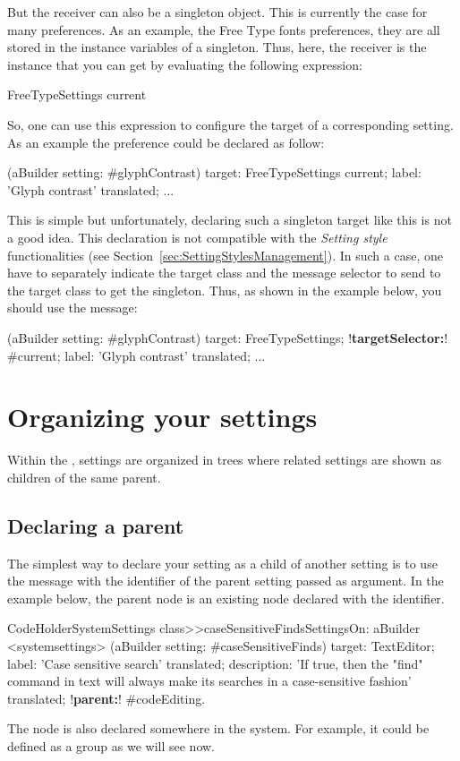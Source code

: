 \documentclass[a4paper,10pt,twoside]{book}
\begin{document}
But the receiver can also be a singleton object. This is currently the case for many preferences. As an example, the Free Type fonts preferences, they are all stored in the instance variables of a  singleton. Thus, here, the receiver is the  instance that you can get by evaluating the following expression:
\begin{code}{}
FreeTypeSettings current
\end{code}
So, one can use this expression  to configure the target of a corresponding setting. As an example the  preference could be declared as follow:
\begin{code}{}
(aBuilder setting: #glyphContrast) 
	target: FreeTypeSettings current;
	label: 'Glyph contrast' translated;
    ...
\end{code}
This is simple but unfortunately, declaring such a singleton target like this is not a good idea. This declaration is not compatible with the \textit{Setting style} functionalities (see Section~\ref{sec:SettingStylesManagement}). In such a case, one have to separately indicate the target class and the message selector to send to the target class to get the singleton. Thus, as shown in the example below, you should use the  message:

\begin{code}{}
(aBuilder setting: #glyphContrast) 
	target: FreeTypeSettings;
	!\textbf{targetSelector:}! #current;
	label: 'Glyph contrast' translated;
    ...
\end{code}

\section{Organizing your settings}

Within the \setbrowser, settings are organized in trees where related settings are shown as children of the same parent. 

\subsection{Declaring a parent}
The simplest way to declare your setting as a child of another setting is to use the  message with the identifier of the parent setting passed as argument. In the example below, the parent node is an existing node declared with the  identifier. 

\begin{code}{}
CodeHolderSystemSettings class>>caseSensitiveFindsSettingsOn: aBuilder
	<systemsettings>
	(aBuilder setting: #caseSensitiveFinds) 
		target: TextEditor;
		label: 'Case sensitive search' translated;
		description: 'If true, then the "find" command in text will always make its searches in a case-sensitive fashion' translated;
		!\textbf{parent:}! #codeEditing.
\end{code}
The  node is also declared somewhere in the system. For example, it could be defined as a group as we will see now. 
\end{document}

